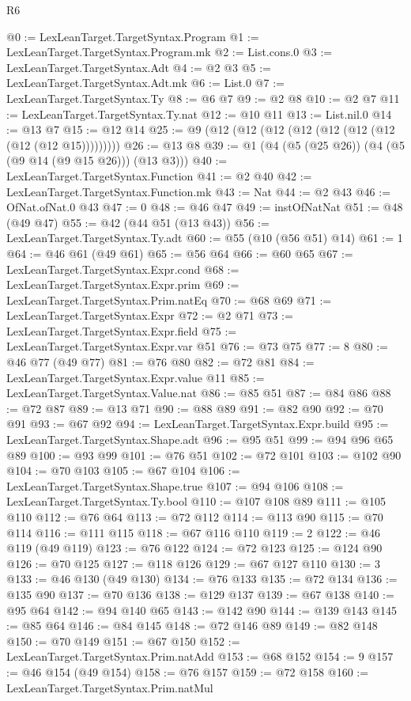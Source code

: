 \begin{lexlean}{R6}
\begin{coremodule}
@0 := LexLeanTarget.TargetSyntax.Program
@1 := LexLeanTarget.TargetSyntax.Program.mk
@2 := List.cons.{0}
@3 := LexLeanTarget.TargetSyntax.Adt
@4 := @2 @3
@5 := LexLeanTarget.TargetSyntax.Adt.mk
@6 := List.{0}
@7 := LexLeanTarget.TargetSyntax.Ty
@8 := @6 @7
@9 := @2 @8
@10 := @2 @7
@11 := LexLeanTarget.TargetSyntax.Ty.nat
@12 := @10 @11
@13 := List.nil.{0}
@14 := @13 @7
@15 := @12 @14
@25 := @9 (@12 (@12 (@12 (@12 (@12 (@12 (@12 (@12 (@12 @15)))))))))
@26 := @13 @8
@39 := @1 (@4 (@5 (@25 @26)) (@4 (@5 (@9 @14 (@9 @15 @26))) (@13 @3)))
@40 := LexLeanTarget.TargetSyntax.Function
@41 := @2 @40
@42 := LexLeanTarget.TargetSyntax.Function.mk
@43 := Nat
@44 := @2 @43
@46 := OfNat.ofNat.{0} @43
@47 := 0
@48 := @46 @47
@49 := instOfNatNat
@51 := @48 (@49 @47)
@55 := @42 (@44 @51 (@13 @43))
@56 := LexLeanTarget.TargetSyntax.Ty.adt
@60 := @55 (@10 (@56 @51) @14)
@61 := 1
@64 := @46 @61 (@49 @61)
@65 := @56 @64
@66 := @60 @65
@67 := LexLeanTarget.TargetSyntax.Expr.cond
@68 := LexLeanTarget.TargetSyntax.Expr.prim
@69 := LexLeanTarget.TargetSyntax.Prim.natEq
@70 := @68 @69
@71 := LexLeanTarget.TargetSyntax.Expr
@72 := @2 @71
@73 := LexLeanTarget.TargetSyntax.Expr.field
@75 := LexLeanTarget.TargetSyntax.Expr.var @51
@76 := @73 @75
@77 := 8
@80 := @46 @77 (@49 @77)
@81 := @76 @80
@82 := @72 @81
@84 := LexLeanTarget.TargetSyntax.Expr.value @11
@85 := LexLeanTarget.TargetSyntax.Value.nat
@86 := @85 @51
@87 := @84 @86
@88 := @72 @87
@89 := @13 @71
@90 := @88 @89
@91 := @82 @90
@92 := @70 @91
@93 := @67 @92
@94 := LexLeanTarget.TargetSyntax.Expr.build
@95 := LexLeanTarget.TargetSyntax.Shape.adt
@96 := @95 @51
@99 := @94 @96 @65 @89
@100 := @93 @99
@101 := @76 @51
@102 := @72 @101
@103 := @102 @90
@104 := @70 @103
@105 := @67 @104
@106 := LexLeanTarget.TargetSyntax.Shape.true
@107 := @94 @106
@108 := LexLeanTarget.TargetSyntax.Ty.bool
@110 := @107 @108 @89
@111 := @105 @110
@112 := @76 @64
@113 := @72 @112
@114 := @113 @90
@115 := @70 @114
@116 := @111 @115
@118 := @67 @116 @110
@119 := 2
@122 := @46 @119 (@49 @119)
@123 := @76 @122
@124 := @72 @123
@125 := @124 @90
@126 := @70 @125
@127 := @118 @126
@129 := @67 @127 @110
@130 := 3
@133 := @46 @130 (@49 @130)
@134 := @76 @133
@135 := @72 @134
@136 := @135 @90
@137 := @70 @136
@138 := @129 @137
@139 := @67 @138
@140 := @95 @64
@142 := @94 @140 @65
@143 := @142 @90
@144 := @139 @143
@145 := @85 @64
@146 := @84 @145
@148 := @72 @146 @89
@149 := @82 @148
@150 := @70 @149
@151 := @67 @150
@152 := LexLeanTarget.TargetSyntax.Prim.natAdd
@153 := @68 @152
@154 := 9
@157 := @46 @154 (@49 @154)
@158 := @76 @157
@159 := @72 @158
@160 := LexLeanTarget.TargetSyntax.Prim.natMul

\end{coremodule}
\end{lexlean}

